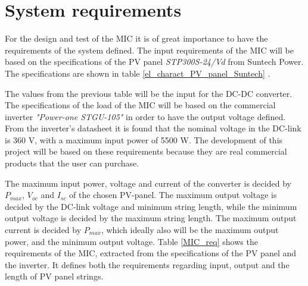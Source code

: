 \section{System requirements}

For the design and test of the MIC it is of great importance to have the requirements of the system defined. The input requirements of the MIC will be based on the specifications of the PV panel \textit{STP300S-24/Vd} from Suntech Power. The specifications are shown in table \ref{el_charact_PV_panel_Suntech} .


The values from the previous table will be the input for the DC-DC converter. The specifications of the load of the MIC will be based on the commercial inverter \textit{"Power-one STGU-105"}\cite{power_one_inverter} in order to have the output voltage defined. From the inverter's datasheet it is found that the nominal voltage in the DC-link is 360 V, with a maximum input power of 5500 W. The development of this project will be based on these requirements because they are real commercial products that the user can purchase. 

The maximum input power, voltage and current of the converter is decided by $P_{max}$, $V_{oc}$ and $I_{sc}$ of the chosen PV-panel. The maximum output voltage is decided by the DC-link voltage and minimum string length, while the minimum output voltage is decided by the maximum string length. The maximum output current is decided by $P_{max}$, which ideally also will be the maximum output power, and the minimum output voltage. Table \ref{MIC_req} shows the requirements of the MIC, extracted from the specifications of the PV panel and the inverter. It defines both the requirements regarding input, output and the length of PV panel strings. 

